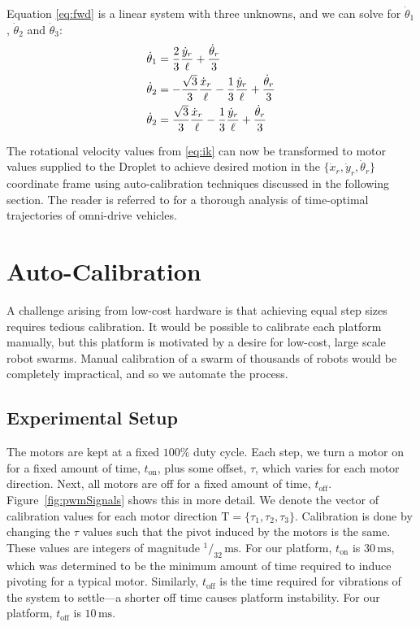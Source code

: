\documentclass[letterpaper, 10pt, conference]{ieeeconf}
\newcommand{\Tau}{\boldsymbol{\mathrm{T}}}
\begin{document}
Equation \ref{eq:fwd} is a linear system with three unknowns, and we can solve for $\dot{\theta}_1$, $\dot{\theta}_2$ and $\dot{\theta}_3$:
\begin{align}\label{eq:ik}
\dot{\theta}_1 &=  \frac{2}{3}\frac{\dot{y}_r}{\ell} + \frac{\dot{\theta}_r}{3}\notag\\
\dot{\theta}_2 &= -\frac{\sqrt{3}}{3}\frac{\dot{x}_r}{\ell} - \frac{1}{3}\frac{\dot{y}_r}{\ell} + \frac{\dot{\theta}_r}{3}\\
\dot{\theta}_2 &= \frac{\sqrt{3}}{3}\frac{\dot{x}_r}{\ell} - \frac{1}{3}\frac{\dot{y}_r}{\ell} + \frac{\dot{\theta}_r}{3}\notag
\end{align}

The rotational velocity values from \eqref{eq:ik} can now be transformed to motor values supplied to the Droplet to achieve desired motion in the $\{\dot{x}_r, \dot{y}_r, \dot{\theta}_r\}$ coordinate frame using auto-calibration techniques discussed in the following section. The reader is referred to \cite{balkcom2006time} for a thorough analysis of time-optimal trajectories of omni-drive vehicles. 

\section{Auto-Calibration}
A challenge arising from low-cost hardware is that achieving equal step sizes requires tedious calibration.
It would be possible to calibrate each platform manually, but this platform is motivated by a desire for low-cost, large scale robot swarms.  Manual calibration of a swarm of thousands of robots would be completely impractical, and so we automate the process. 

\subsection{Experimental Setup}
The motors are kept at a fixed $100\%$ duty cycle. Each step, we turn a motor on for a fixed amount of time, $t_{\text{on}}$, plus some offset, $\tau$,  which varies for each motor direction. Next, all motors are off for a fixed amount of time, $t_{\text{off}}$. Figure~\ref{fig:pwmSignals} shows this in more detail. We denote the vector of calibration values for each motor direction $\Tau=\{\tau_1, \tau_2, \tau_3\}$. Calibration is done by changing the $\tau$ values such that the pivot induced by the motors is the same. These values are integers of magnitude $^1/_{32}\,\mathrm{ms}$. For our platform, $t_{\text{on}}$ is $30\,\mathrm{ms}$, which was determined to be the minimum amount of time required to induce pivoting for a typical motor. Similarly, $t_{\text{off}}$ is the time required for vibrations of the system to settle---a shorter off time causes platform instability. For our platform, $t_{\text{off}}$ is $10\,\mathrm{ms}$.
\end{document}

